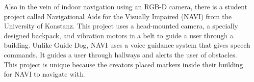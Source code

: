 Also in the vein of indoor navigation using an RGB-D camera, there is a student
project called Navigational Aids for the Visually Impaired (NAVI)
\cite{navi-website} from the University of Konstanz. This project uses a
head-mounted camera, a specially designed backpack, and vibration motors in a
belt to guide a user through a building. Unlike Guide Dog, NAVI uses a voice
guidance system that gives speech commands. It guides a user through
hallways and alerts the user of obstacles.
This project is unique because the creators placed markers inside their
building for NAVI to navigate with.
